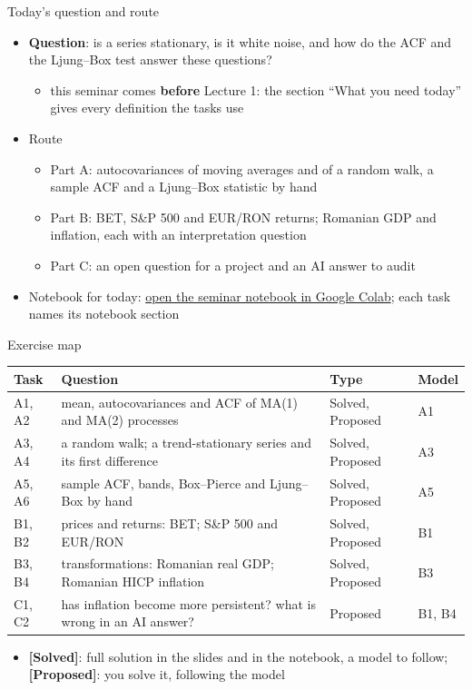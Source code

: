 \begin{frame}{Today's question and route}
\itemsize{\small}
\begin{itemize}
    \item \textbf{Question}: is a series stationary, is it white noise, and how do the ACF and the Ljung--Box test answer these questions?
    \begin{itemize}
        \item this seminar comes \textbf{before} Lecture 1: the section ``What you need today'' gives every definition the tasks use
    \end{itemize}
    \item Route
    \begin{itemize}
        \item Part A: autocovariances of moving averages and of a random walk, a sample ACF and a Ljung--Box statistic by hand
        \item Part B: BET, S\&P 500 and EUR/RON returns; Romanian GDP and inflation, each with an interpretation question
        \item Part C: an open question for a project and an AI answer to audit
    \end{itemize}
    \item Notebook for today: \href{\nb}{open the seminar notebook in Google Colab}; each task names its notebook section
\end{itemize}
\end{frame}

\begin{frame}{Exercise map}
\itemsize{\small}
\begin{center}
\footnotesize
\begin{tabular}{>{\raggedright\arraybackslash}p{1.1cm}>{\raggedright\arraybackslash}p{7.5cm}>{\raggedright\arraybackslash}p{1.9cm}>{\raggedright\arraybackslash}p{1.4cm}}
\toprule
\textbf{Task} & \textbf{Question} & \textbf{Type} & \textbf{Model} \\
\midrule
A1, A2 & mean, autocovariances and ACF of MA(1) and MA(2) processes & Solved, Proposed & A1 \\
A3, A4 & a random walk; a trend-stationary series and its first difference & Solved, Proposed & A3 \\
A5, A6 & sample ACF, bands, Box--Pierce and Ljung--Box by hand & Solved, Proposed & A5 \\
B1, B2 & prices and returns: BET; S\&P 500 and EUR/RON & Solved, Proposed & B1 \\
B3, B4 & transformations: Romanian real GDP; Romanian HICP inflation & Solved, Proposed & B3 \\
C1, C2 & has inflation become more persistent? what is wrong in an AI answer? & Proposed & B1, B4 \\
\bottomrule
\end{tabular}
\end{center}
\begin{itemize}
    \item \textbf{[Solved]}: full solution in the slides and in the notebook, a model to follow; \textbf{[Proposed]}: you solve it, following the model
\end{itemize}
\end{frame}


